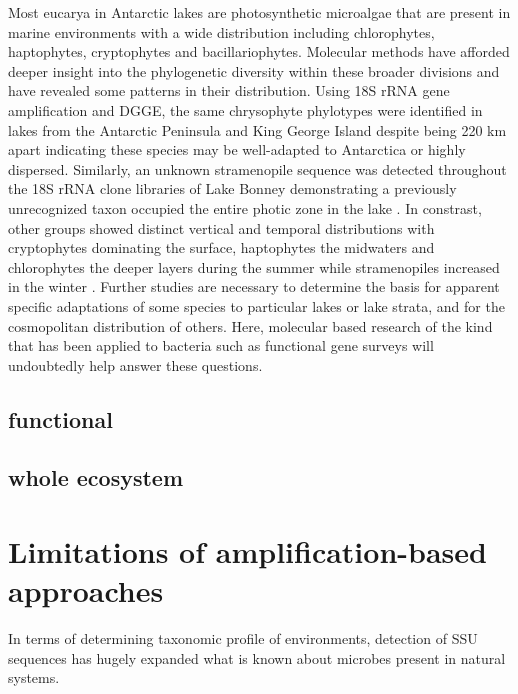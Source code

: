 Most eucarya in Antarctic lakes are photosynthetic microalgae that are present in marine environments with a wide distribution including chlorophytes, haptophytes, cryptophytes and bacillariophytes.
Molecular methods have afforded deeper insight into the phylogenetic diversity within these broader divisions and have revealed some patterns in their distribution. 
Using 18S rRNA gene amplification and DGGE, the same chrysophyte phylotypes were identified in lakes from the Antarctic Peninsula and King George Island 
despite being 220 km apart \cite{Unrein2005} indicating these species may be well-adapted to Antarctica or highly dispersed.
Similarly, an unknown stramenopile sequence was detected throughout the 18S rRNA clone libraries of Lake Bonney 
demonstrating a previously unrecognized taxon occupied the entire photic zone in the lake \cite{Bielewicz2011}. 
In constrast, other groups showed distinct vertical and temporal distributions with cryptophytes dominating the surface, 
haptophytes the midwaters and chlorophytes the deeper layers during the summer while stramenopiles increased in the winter \cite{Bielewicz2011}. 
Further studies are necessary to determine the basis for apparent specific adaptations of some species to particular lakes or lake strata, and for the cosmopolitan distribution of others.
Here, molecular based research of the kind that has been applied to bacteria such as functional gene surveys will undoubtedly help answer these questions.

\subsection{functional}

\subsection{whole ecosystem}

\section{Limitations of amplification-based approaches}

In terms of determining taxonomic profile of environments, detection of SSU sequences has hugely expanded what is known about microbes present in natural systems.

